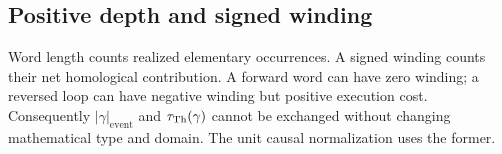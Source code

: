 \subsection{Positive depth and signed winding}
Word length counts realized elementary occurrences. A signed winding counts their net homological contribution. A forward word can have zero winding; a reversed loop can have negative winding but positive execution cost. Consequently $|\gamma|_{\mathrm{event}}$ and $\tau_{\mathrm{Th}}(\gamma)$ cannot be exchanged without changing mathematical type and domain. The unit causal normalization uses the former.
